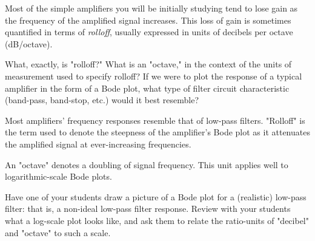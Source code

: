 

Most of the simple amplifiers you will be initially studying tend to lose gain as the frequency of the amplified signal increases.  This loss of gain is sometimes quantified in terms of {\it rolloff}, usually expressed in units of decibels per octave (dB/octave).

What, exactly, is "rolloff?"  What is an "octave," in the context of the units of measurement used to specify rolloff?  If we were to plot the response of a typical amplifier in the form of a Bode plot, what type of filter circuit characteristic (band-pass, band-stop, etc.) would it best resemble?







Most amplifiers' frequency responses resemble that of low-pass filters.  "Rolloff" is the term used to denote the steepness of the amplifier's Bode plot as it attenuates the amplified signal at ever-increasing frequencies.  

An "octave" denotes a doubling of signal frequency.  This unit applies well to logarithmic-scale Bode plots.







Have one of your students draw a picture of a Bode plot for a (realistic) low-pass filter: that is, a non-ideal low-pass filter response.  Review with your students what a log-scale plot looks like, and ask them to relate the ratio-units of "decibel" and "octave" to such a scale.





